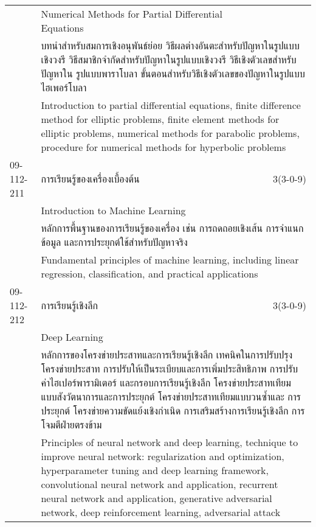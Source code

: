 \begin{longtable}{p{}p{}r{}}
 & Numerical Methods for Partial Differential Equations & \phantom{x} \vspace{3mm} \\*
&  \multicolumn{2}{p{0.75\textwidth}}{บทนำสำหรับสมการเชิงอนุพันธ์ย่อย วิธีผลต่างอันตะสำหรับปัญหาในรูปแบบเชิงวงรี วิธีสมาชิกจำกัดสำหรับปัญหาในรูปแบบเชิงวงรี วิธีเชิงตัวเลขสำหรับปัญหาใน รูปแบบพาราโบลา ขั้นตอนสำหรับวิธีเชิงตัวเลขของปัญหาในรูปแบบไฮเพอร์โบลา} \vspace{3mm} \\*
&  \multicolumn{2}{p{0.75\textwidth}}{Introduction to partial differential equations, finite difference method for elliptic problems, finite element methods for elliptic problems, numerical methods for parabolic problems, procedure for numerical methods for hyperbolic problems} \vspace{8mm} \\*
09-112-211 & การเรียนรู้ของเครื่องเบื้องต้น & 3(3-0-9)\\*
 & Introduction to Machine Learning & \phantom{x} \vspace{3mm} \\*
&  \multicolumn{2}{p{0.75\textwidth}}{หลักการพื้นฐานของการเรียนรู้ของเครื่อง เช่น การถดถอยเชิงเส้น การจำแนกข้อมูล และการประยุกต์ใช้สำหรับปัญหาจริง} \vspace{3mm} \\*
&  \multicolumn{2}{p{0.75\textwidth}}{Fundamental principles of machine learning, including linear regression, classification, and practical applications} \vspace{8mm} \\*
09-112-212 & การเรียนรู้เชิงลึก & 3(3-0-9)\\*
 & Deep Learning & \phantom{x} \vspace{3mm} \\*
&  \multicolumn{2}{p{0.75\textwidth}}{หลักการของโครงข่ายประสาทและการเรียนรู้เชิงลึก เทคนิคในการปรับปรุงโครงข่ายประสาท การปรับให้เป็นระเบียบและการเพิ่มประสิทธิภาพ การปรับค่าไฮเปอร์พารามิเตอร์ และกรอบการเรียนรู้เชิงลึก โครงข่ายประสาทเทียมแบบสังวัตนาการและการประยุกต์ โครงข่ายประสาทเทียมแบบวนซ้ำและ การประยุกต์ โครงข่ายความขัดแย้งเชิงกำเนิด การเสริมสร้างการเรียนรู้เชิงลึก การโจมตีฝ่ายตรงข้าม} \vspace{3mm} \\*
&  \multicolumn{2}{p{0.75\textwidth}}{Principles of neural network and deep learning, technique to improve neural network: regularization and optimization, hyperparameter tuning and deep learning framework, convolutional neural network and application, recurrent neural network and application, generative adversarial network, deep reinforcement learning, adversarial attack} \vspace{8mm} \\*

\end{longtable}
